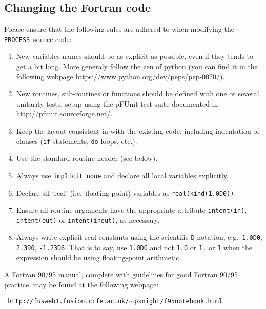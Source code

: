 \documentclass[11pt,a4paper]{report}
\newcommand{\process}{\mbox{\texttt{PROCESS}}}
\begin{document}
\subsection{Changing the Fortran code}

Please ensure that the following rules are adhered to when modifying the
\process\ source code:

\begin{enumerate}

\item New variables names should be as explicit as possible, even if they tends to get a bit long. More generaly follow the zen of python (you can find it in the following webpage \url{https://www.python.org/dev/peps/pep-0020/}).

\item New routines, sub-routines or functions should be defined with one or several unitarity tests, setup using the pFUnit test suite documented in \url{http://pfunit.sourceforge.net/}.

\item Keep the layout consistent in with the existing code,
  including indentation of clauses (\texttt{if}-statements, \texttt{do}-loops,
  etc.).

\item Use the standard routine header (see below).

\item Always use \verb+implicit none+ and declare all local variables
  explicitly.

\item Declare all `real' (i.e.\ floating-point) variables as
  \texttt{real(kind(1.0D0))}.

\item Ensure all routine arguments have the appropriate attribute \texttt{intent(in)},
  \texttt{intent(out)} or \texttt{intent(inout)}, as necessary.

\item Always write explicit real constants using the scientific \texttt{D}
  notation, e.g.\ \texttt{1.0D0}, \texttt{2.3D0}, \texttt{-1.23D6}. That is to
  say, use \texttt{1.0D0} and not \texttt{1.0} or \texttt{1.} or \texttt{1} when the
  expression should be using floating-point arithmetic.

\end{enumerate}

A Fortran 90/95 manual, complete with guidelines for good Fortran 90/95
practice, may be found at the following webpage:
\begin{center}
\texttt{
\href{http://fusweb1.fusion.ccfe.ac.uk/~pknight/f95notebook.html}
{http://fusweb1.fusion.ccfe.ac.uk/$\sim$pknight/f95notebook.html}
}
\end{center}
\end{document}
